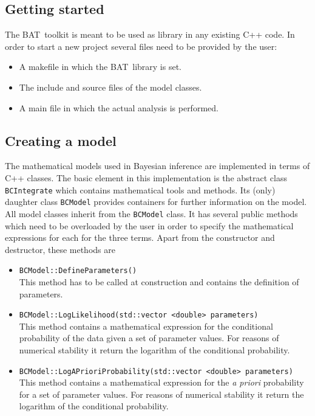 \documentclass[11pt, a4paper]{article}
\newcommand{\BAT}{{\sc BAT}}
\begin{document}

\subsection{Getting started} 

The \BAT\ toolkit is meant to be used as library in any existing C++
code. In order to start a new project several files need to be
provided by the user:
% 
\begin{itemize}
\item A makefile in which the \BAT\ library is set. 
\item The include and source files of the model classes. 
\item A main file in which the actual analysis is performed. 
\end{itemize} 


\subsection{Creating a model} 

The mathematical models used in Bayesian inference are implemented in
terms of C++ classes. The basic element in this implementation is the
abstract class \verb|BCIntegrate| which contains mathematical tools
and methods. Its (only) daughter class \verb|BCModel| provides
containers for further information on the model. All model classes
inherit from the \verb|BCModel| class. It has several public methods
which need to be overloaded by the user in order to specify the
mathematical expressions for each for the three terms. Apart from the
constructor and destructor, these methods are
% 
\begin{itemize}
\item \verb|BCModel::DefineParameters()| \\
 This method has to be called at construction and contains the
 definition of parameters. 
% 
\item \verb|BCModel::LogLikelihood(std::vector <double> parameters)| \\ 
 This method contains a mathematical expression for the conditional
 probability of the data given a set of parameter values. For reasons
 of numerical stability it return the logarithm of the conditional
 probability.
%
\item \verb|BCModel::LogAPrioriProbability(std::vector <double> parameters)| \\
 This method contains a mathematical expression for the {\it a priori}
 probability for a set of parameter values. For reasons
 of numerical stability it return the logarithm of the conditional
 probability.
\end{itemize} 
\end{document}
